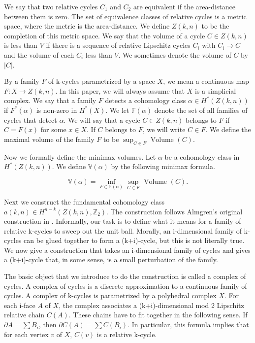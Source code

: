 \documentclass{amsart}
\newtheorem*{Theorem 1}{Theorem 1}
\newtheorem*{Theorem 2}{Theorem 2}
\newtheorem*{Theorem 1A}{Theorem 1A}
\newtheorem*{Theorem 2A}{Theorem 2A}
\newtheorem*{vanishing lemma}{Vanishing Lemma}
\numberwithin{equation}{section}
\begin{document}
We say that two relative cycles $C_1$ and $C_2$ are equivalent if
the area-distance between them is zero.  The set of equivalence
classes of relative cycles is a metric space, where the metric
is the area-distance.  We define $Z(k,n)$ to be the completion
of this metric space.  We say that the volume of a cycle $C \in
Z(k,n)$ is less than $V$ if there is a sequence of relative
Lipschitz cycles $C_i$ with $C_i \rightarrow C$ and the volume of
each $C_i$ less than $V$.  We sometimes denote the volume of $C$
by $|C|$.

By a family $F$ of k-cycles parametrized by a space $X$, we mean
a continuous map $F: X \rightarrow Z(k,n)$.  In this paper, we
will always assume that $X$ is a simplicial complex.  We say that
a family $F$ detects a cohomology class $\alpha \in H^*(Z(k,n))$
if $F^*(\alpha)$ is non-zero in $H^*(X)$.  We let
$\mathbb{F}(\alpha)$ denote the set of all families of cycles
that detect $\alpha$.  We will say that a cycle $C \in Z(k,n)$
belongs to $F$ if $C = F(x)$ for some $x \in X$.  If $C$ belongs
to $F$, we will write $C \in F$.  We define the maximal
volume of the family $F$ to be $\sup_{C \in F} \textrm{ Volume }(C)$.

Now we formally define the minimax volumes.  Let $\alpha$ be a
cohomology class in $H^*(Z(k,n))$.  We define
$\mathbb{V}(\alpha)$ by the following minimax formula.

$$\mathbb{V}(\alpha) = \inf_{F \in \mathbb{F}(\alpha)} \sup_{C
\in F} \textrm{ Volume }(C).$$

Next we construct the fundamental cohomology class $a(k,n) \in
H^{n-k}(Z(k,n), \mathbb{Z}_2)$.  The construction follows
Almgren's original construction in \cite{A}. Informally, our task
is to define what it means for a family of relative k-cycles to
sweep out the unit ball.  Morally, an i-dimensional family of
k-cycles can be glued together to form a (k+i)-cycle, but this is
not literally true.  We now give a construction that takes an
i-dimensional family of cycles and gives a (k+i)-cycle that, in
some sense, is a small perturbation of the family.

The basic object that we introduce to do the construction is called
a complex of cycles.  A complex of cycles is a discrete approximation
to a continuous family of cycles.  A complex of k-cycles is
parametrized by a polyhedral complex $X$.  For each i-face $A$ of $X$,
the complex associates a (k+i)-dimensional mod 2 Lipschitz relative chain
$C(A)$.  These chains have to fit together in the following sense.
If $\partial A = \sum B_i$, then $\partial C(A) = \sum C(B_i)$.
In particular, this formula implies that for each vertex $v$ of $X$,
$C(v)$ is a relative k-cycle.
\end{document}
